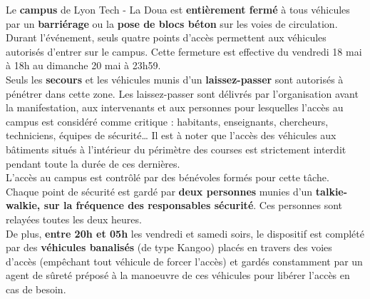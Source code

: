 \documentclass[hidelinks, paper=a4, fontsize=13pt]{report}
\begin{document}
Le \textbf{campus} de Lyon Tech - La Doua est \textbf{entièrement fermé} à tous véhicules par un \textbf{barriérage} ou la \textbf{pose de blocs béton} sur les voies de circulation. Durant l'événement, seuls quatre points d'accès permettent aux véhicules autorisés d'entrer sur le campus.
Cette fermeture est effective du vendredi 18 mai à 18h au dimanche 20 mai à 23h59.\\

Seuls les \textbf{secours} et les véhicules munis d’un \textbf{laissez-passer} sont autorisés à pénétrer dans cette zone. Les laissez-passer sont délivrés par l'organisation avant la manifestation, aux intervenants et aux personnes pour lesquelles l’accès au campus est considéré comme critique : habitants, enseignants, chercheurs, techniciens, équipes de sécurité… Il est à noter que l’accès des véhicules aux bâtiments situés à l’intérieur du périmètre des courses est strictement interdit pendant toute la durée de ces dernières.\\

L’accès au campus est contrôlé par des bénévoles formés pour cette tâche. Chaque point de sécurité est gardé par \textbf{deux personnes} munies d’un \textbf{talkie-walkie, sur la fréquence des responsables sécurité}. Ces personnes sont relayées toutes les deux heures. \\
De plus, \textbf{entre 20h et 05h} les vendredi et samedi soirs, le dispositif est complété par des \textbf{véhicules banalisés} (de type Kangoo) placés en travers des voies d'accès (empêchant tout véhicule de forcer l'accès) et gardés constamment par un agent de sûreté préposé à la manoeuvre de ces véhicules pour libérer l'accès en cas de besoin.\\
\end{document}
